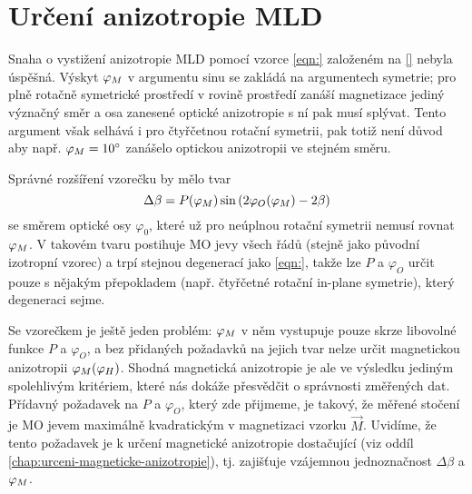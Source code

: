 \section{Určení anizotropie MLD}
\label{chap:anizotropie-MLD}

Snaha o vystižení anizotropie MLD pomocí vzorce \eqref{eqn:} založeném na \eqref{} nebyla úspěšná.
Výskyt $\varphi_M$ v argumentu sinu se zakládá na argumentech symetrie; pro plně rotačně symetrické prostředí v rovině prostředí zanáší magnetizace jediný význačný směr a osa zanesené optické anizotropie s ní pak musí splývat.
Tento argument však selhává i pro čtyřčetnou rotační symetrii, pak totiž není důvod aby např. $\varphi_M=\SI{10}{\degree}$ zanášelo optickou anizotropii ve stejném směru.

Správné rozšíření vzorečku by mělo tvar
\begin{equation}
\label{eqn:PMLD-ansatz}
    \Delta\beta = P(\varphi_M) \sin \left( 2\varphi_O(\varphi_M) - 2\beta   \right)
\end{equation}
se směrem optické osy $\varphi_0$, které už pro neúplnou rotační symetrii nemusí rovnat $\varphi_M$.
V takovém tvaru postihuje MO jevy všech řádů (stejně jako původní izotropní vzorec) a trpí stejnou degenerací jako \eqref{eqn:}, takže lze $P$ a $\varphi_O$ určit pouze s nějakým přepokladem (např. čtyřčetné rotační in-plane symetrie), který degeneraci sejme.

Se vzorečkem je ještě jeden problém: $\varphi_M$ v něm vystupuje pouze skrze libovolné funkce $P$ a $\varphi_O$, a bez přidaných požadavků na jejich tvar nelze určit magnetickou anizotropii $\varphi_M(\varphi_H)$.
Shodná magnetická anizotropie je ale ve výsledku jediným spolehlivým kritériem, které nás dokáže přesvědčit o správnosti změřených dat.
Přídavný požadavek na $P$ a $\varphi_O$, který zde přijmeme, je takový, že měřené stočení je MO jevem maximálně kvadratickým v magnetizaci vzorku $\vec{M}$.
Uvidíme, že tento požadavek je k určení magnetické anizotropie dostačující (viz oddíl \ref{chap:urceni-magneticke-anizotropie}), tj. zajišťuje vzájemnou jednoznačnost $\Delta\beta$ a $\varphi_M$.

